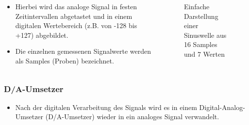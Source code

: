 \begin{frame}
\begin{columns}
    \begin{column}{0.48\textwidth}
    \begin{itemize}
  \item Hierbei wird das analoge Signal in festen Zeitintervallen abgetastet und in einem digitalen Wertebereich (z.B. von -128 bis +127) abgebildet.
  \item Die einzelnen gemessenen Signalwerte werden als Samples (Proben) bezeichnet.
  \end{itemize}

    \end{column}
   \begin{column}{0.48\textwidth}
       
\begin{figure}
    \caption{\scriptsize Einfache Darstellung einer Sinuswelle aus 16 Samples und 7 Werten}
    \label{e_digitale_signalverarbeitung}
\end{figure}


   \end{column}
\end{columns}

\end{frame}

\begin{frame}
\end{frame}

\begin{frame}
\frametitle{D/A-Umsetzer}
\begin{itemize}
  \item Nach der digitalen Verarbeitung des Signals wird es in einem Digital-Analog-Umsetzer (D/A-Umsetzer) wieder in ein analoges Signal verwandelt.
  \end{itemize}
\end{frame}

